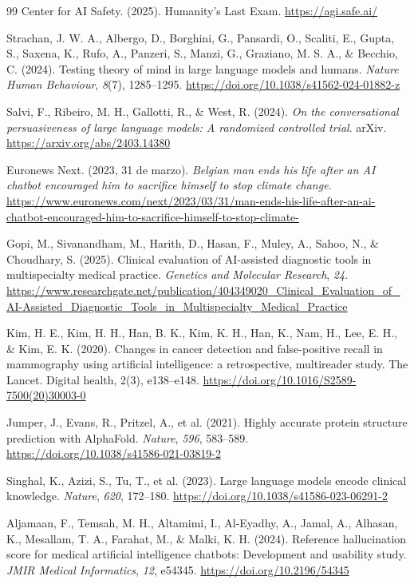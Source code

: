 \documentclass[10pt,a4paper]{article}
\begin{document}
\begin{thebibliography}{99}
     Center for AI Safety. (2025). Humanity's Last Exam. \url{https://agi.safe.ai/}
    
     Strachan, J. W. A., Albergo, D., Borghini, G., Pansardi, O., Scaliti, E., Gupta, S., Saxena, K., Rufo, A., Panzeri, S., Manzi, G., Graziano, M. S. A., \& Becchio, C. (2024). Testing theory of mind in large language models and humans. \textit{Nature Human Behaviour}, \textit{8}(7), 1285–1295. \url{https://doi.org/10.1038/s41562-024-01882-z}
    
     Salvi, F., Ribeiro, M. H., Gallotti, R., \& West, R. (2024). \textit{On the conversational persuasiveness of large language models: A randomized controlled trial}. arXiv. \url{https://arxiv.org/abs/2403.14380}
    
     Euronews Next. (2023, 31 de marzo). \textit{Belgian man ends his life after an AI chatbot encouraged him to sacrifice himself to stop climate change}. \url{https://www.euronews.com/next/2023/03/31/man-ends-his-life-after-an-ai-chatbot-encouraged-him-to-sacrifice-himself-to-stop-climate-}

     Gopi, M., Sivanandham, M., Harith, D., Hasan, F., Muley, A., Sahoo, N., \& Choudhary, S. (2025). Clinical evaluation of AI-assisted diagnostic tools in multispecialty medical practice. \textit{Genetics and Molecular Research}, \textit{24}. \url{https://www.researchgate.net/publication/404349020_Clinical_Evaluation_of_AI-Assisted_Diagnostic_Tools_in_Multispecialty_Medical_Practice}
    
     Kim, H. E., Kim, H. H., Han, B. K., Kim, K. H., Han, K., Nam, H., Lee, E. H., \& Kim, E. K. (2020). Changes in cancer detection and false-positive recall in mammography using artificial intelligence: a retrospective, multireader study. The Lancet. Digital health, 2(3), e138–e148. \url{https://doi.org/10.1016/S2589-7500(20)30003-0}
    
     Jumper, J., Evans, R., Pritzel, A., et al. (2021). Highly accurate protein structure prediction with AlphaFold. \textit{Nature}, \textit{596}, 583–589. \url{https://doi.org/10.1038/s41586-021-03819-2}
    
     Singhal, K., Azizi, S., Tu, T., et al. (2023). Large language models encode clinical knowledge. \textit{Nature}, \textit{620}, 172–180. \url{https://doi.org/10.1038/s41586-023-06291-2}
    
     Aljamaan, F., Temsah, M. H., Altamimi, I., Al-Eyadhy, A., Jamal, A., Alhasan, K., Mesallam, T. A., Farahat, M., \& Malki, K. H. (2024). Reference hallucination score for medical artificial intelligence chatbots: Development and usability study. \textit{JMIR Medical Informatics}, \textit{12}, e54345. \url{https://doi.org/10.2196/54345}


\end{thebibliography}
\end{document}
